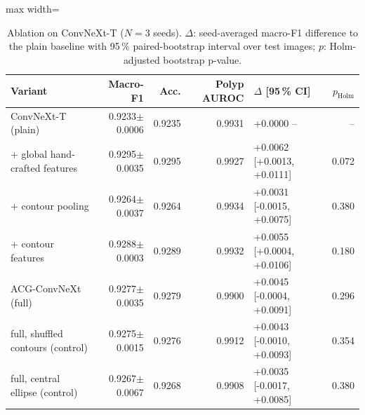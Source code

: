 \begin{table}[t]
\centering
\caption{Ablation on ConvNeXt-T ($N{=}3$ seeds). $\Delta$: seed-averaged macro-F1 difference to the plain baseline with 95\,\% paired-bootstrap interval over test images; $p$: Holm-adjusted bootstrap p-value.}
\label{tab:ablation}
\small
\begin{adjustbox}{max width=\linewidth}\begin{tabular}{lrrrl r}
\toprule
Variant & Macro-F1 & Acc. & Polyp AUROC & $\Delta$ [95\,\% CI] & $p_\mathrm{Holm}$ \\
\midrule
ConvNeXt-T (plain) & 0.9233{\scriptsize$\pm$0.0006} & 0.9235 & 0.9931 & +0.0000 -- & -- \\
+ global hand-crafted features & 0.9295{\scriptsize$\pm$0.0035} & 0.9295 & 0.9927 & +0.0062 [+0.0013, +0.0111] & 0.072 \\
+ contour pooling & 0.9264{\scriptsize$\pm$0.0037} & 0.9264 & 0.9934 & +0.0031 [-0.0015, +0.0075] & 0.380 \\
+ contour features & 0.9288{\scriptsize$\pm$0.0003} & 0.9289 & 0.9932 & +0.0055 [+0.0004, +0.0106] & 0.180 \\
ACG-ConvNeXt (full) & 0.9277{\scriptsize$\pm$0.0035} & 0.9279 & 0.9900 & +0.0045 [-0.0004, +0.0091] & 0.296 \\
full, shuffled contours (control) & 0.9275{\scriptsize$\pm$0.0015} & 0.9276 & 0.9912 & +0.0043 [-0.0010, +0.0093] & 0.354 \\
full, central ellipse (control) & 0.9267{\scriptsize$\pm$0.0067} & 0.9268 & 0.9908 & +0.0035 [-0.0017, +0.0085] & 0.380 \\
\bottomrule
\end{tabular}\end{adjustbox}
\end{table}